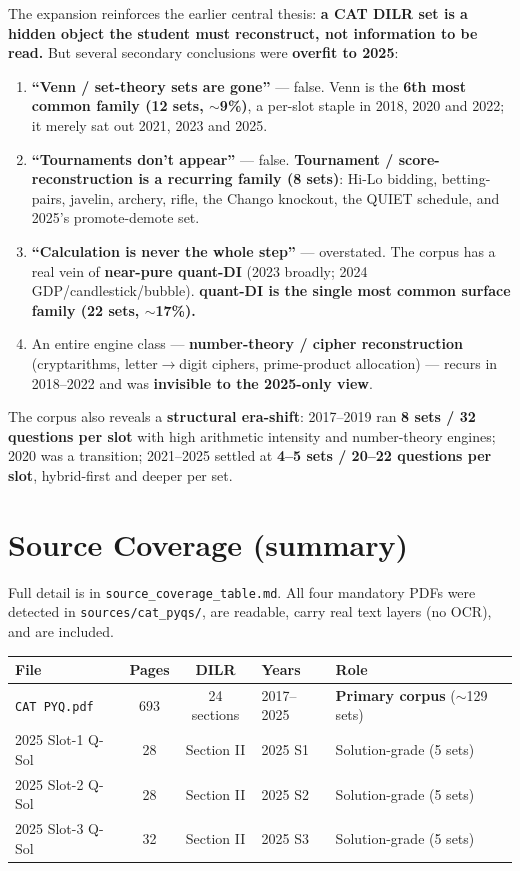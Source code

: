 \documentclass[11pt,a4paper]{article}
\begin{document}
The expansion reinforces the earlier central thesis: \textbf{a CAT DILR set is a hidden object the student must reconstruct, not information to be read.} But several secondary conclusions were \textbf{overfit to 2025}:

\begin{enumerate}[leftmargin=1.6em]
\item \textbf{``Venn / set-theory sets are gone''} --- false. Venn is the \textbf{6th most common family (12 sets, $\sim$9\%)}, a per-slot staple in 2018, 2020 and 2022; it merely sat out 2021, 2023 and 2025.
\item \textbf{``Tournaments don't appear''} --- false. \textbf{Tournament / score-reconstruction is a recurring family (8 sets)}: Hi-Lo bidding, betting-pairs, javelin, archery, rifle, the Chango knockout, the QUIET schedule, and 2025's promote-demote set.
\item \textbf{``Calculation is never the whole step''} --- overstated. The corpus has a real vein of \textbf{near-pure quant-DI} (2023 broadly; 2024 GDP/candlestick/bubble). \textbf{quant-DI is the single most common surface family (22 sets, $\sim$17\%).}
\item An entire engine class --- \textbf{number-theory / cipher reconstruction} (cryptarithms, letter$\to$digit ciphers, prime-product allocation) --- recurs in 2018--2022 and was \textbf{invisible to the 2025-only view}.
\end{enumerate}

The corpus also reveals a \textbf{structural era-shift}: 2017--2019 ran \textbf{8 sets / 32 questions per slot} with high arithmetic intensity and number-theory engines; 2020 was a transition; 2021--2025 settled at \textbf{4--5 sets / 20--22 questions per slot}, hybrid-first and deeper per set.

\section{Source Coverage (summary)}

Full detail is in \texttt{source\_coverage\_table.md}. All four mandatory PDFs were detected in \texttt{sources/cat\_pyqs/}, are readable, carry real text layers (no OCR), and are included.

\begin{center}
\begin{tabular}{lccll}
\toprule
\textbf{File} & \textbf{Pages} & \textbf{DILR} & \textbf{Years} & \textbf{Role} \\
\midrule
\texttt{CAT PYQ.pdf} & 693 & 24 sections & 2017--2025 & \textbf{Primary corpus} ($\sim$129 sets) \\
2025 Slot-1 Q-Sol & 28 & Section II & 2025 S1 & Solution-grade (5 sets) \\
2025 Slot-2 Q-Sol & 28 & Section II & 2025 S2 & Solution-grade (5 sets) \\
2025 Slot-3 Q-Sol & 32 & Section II & 2025 S3 & Solution-grade (5 sets) \\
\bottomrule
\end{tabular}
\end{center}
\end{document}
